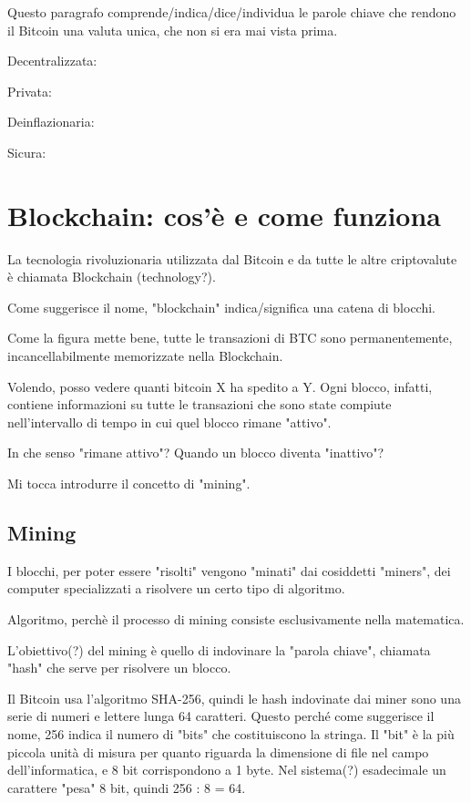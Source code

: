 \documentclass {article}
\begin{document}
Questo paragrafo comprende/indica/dice/individua le parole chiave che rendono il Bitcoin una valuta unica, che non si era mai vista prima.

Decentralizzata:

Privata:

Deinflazionaria:

Sicura:



\section {Blockchain: cos'è e come funziona}



La tecnologia rivoluzionaria utilizzata dal Bitcoin e da tutte le altre criptovalute è chiamata Blockchain (technology?).

Come suggerisce il nome, "blockchain" indica/significa una catena di blocchi.

Come la figura mette bene, tutte le transazioni di BTC sono permanentemente, incancellabilmente memorizzate nella Blockchain.

Volendo, posso vedere quanti bitcoin X ha spedito a Y. Ogni blocco, infatti, contiene informazioni su tutte le transazioni che sono state compiute nell'intervallo di tempo in cui quel blocco rimane "attivo".

In che senso "rimane attivo"? Quando un blocco diventa "inattivo"?

Mi tocca introdurre il concetto di "mining".



\subsection {Mining}



I blocchi, per poter essere "risolti" vengono "minati" dai cosiddetti "miners", dei computer specializzati a risolvere un certo tipo di algoritmo.

Algoritmo, perchè il processo di mining consiste esclusivamente nella matematica.

L'obiettivo(?) del mining è quello di indovinare la "parola chiave", chiamata "hash" che serve per risolvere un blocco.

Il Bitcoin usa l'algoritmo SHA-256, quindi le hash indovinate dai miner sono una serie di numeri e lettere lunga 64 caratteri. Questo perché come suggerisce il nome, 256 indica il numero di "bits" che costituiscono la stringa. Il "bit" è la più piccola unità di misura per quanto riguarda la dimensione di file nel campo dell'informatica, e 8 bit corrispondono a 1 byte.
Nel sistema(?) esadecimale un carattere "pesa" 8 bit, quindi 256 : 8 = 64.
\end{document}
